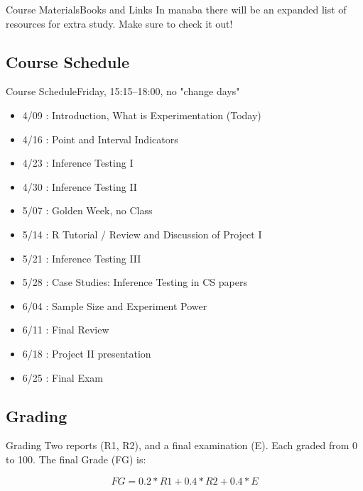 \documentclass[aspectratio=169]{beamer}
\begin{document}
\begin{CJK}{UTF8}{ipxm}
\begin{frame}{Course Materials}{Books and Links}
  In manaba there will be an expanded list of resources for
  extra study. Make sure to check it out!
\end{frame}



\subsection{Course Schedule}
\begin{frame}{Course Schedule}{Friday, 15:15--18:00, no "change days"}
\begin{itemize}
  \item 4/09 : Introduction, What is Experimentation (Today)
  \item 4/16 : Point and Interval Indicators
  \item 4/23 : Inference Testing I
  \item 4/30 : Inference Testing II
  \item \alert{5/07 : Golden Week, no Class}
  \item 5/14 : R Tutorial / Review and Discussion of Project I
  \item 5/21 : Inference Testing III
  \item 5/28 : Case Studies: Inference Testing in CS papers
  \item 6/04 : Sample Size and Experiment Power
  \item 6/11 : Final Review
  \item 6/18 : Project II presentation
  \item 6/25 : \alert{Final Exam}
\end{itemize}
\end{frame}



\subsection{Grading}
\begin{frame}{Grading}
  Two reports (R1, R2), and a final examination (E). Each graded from 0 to 100.
  The final Grade (FG) is:

  \begin{equation*}
    FG = 0.2*R1 + 0.4*R2 + 0.4*E
  \end{equation*}
  \bigskip


\end{frame}
\end{CJK}
\end{document}
